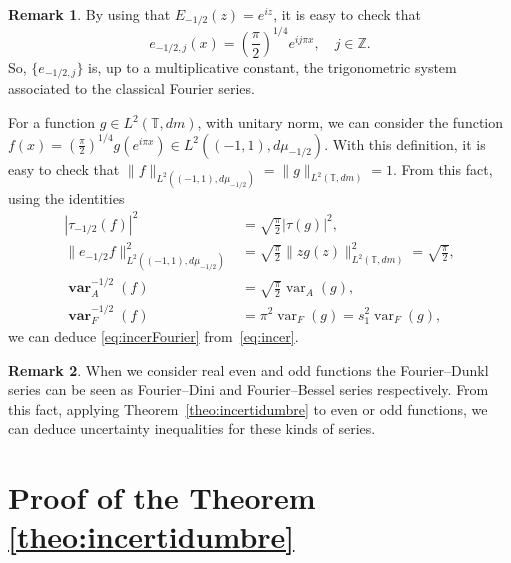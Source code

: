 \documentclass[a4paper]{amsart}
\theoremstyle{plain}
\theoremstyle{definition}
\newtheorem{Rem}{Remark}
\newcommand{\varneg}{\operatorname{\mathbf{var}}}
\newcommand{\var}{\operatorname{var}}
\begin{document}
\begin{Rem}
By using that $E_{-1/2}(z)=e^{iz}$, it is easy to check that
\[
e_{-1/2,j}(x)=\left(\frac{\pi}{2}\right)^{1/4} e^{ij\pi x}, \quad j\in \mathbb{Z}.
\]
So, $\{e_{-1/2,j}\}$ is, up to a multiplicative constant, the trigonometric system associated to the classical Fourier series.

For a function $g\in L^2(\mathbb{T},dm)$, with unitary norm, we can consider the function $f(x) =\left(\frac{\pi}2\right)^{1/4}g(e^{i\pi x})\in L^2((-1,1),d\mu_{-1/2})$. With this definition, it is easy to check that $\|f\|_{L^2((-1,1),d\mu_{-1/2})}=\|g\|_{L^2(\mathbb{T},dm)}=1$.  From this fact, using the identities
\begin{align*}
|\tau_{-1/2}(f)|^2&=\sqrt{\frac{\pi}{2}}|\tau(g)|^2, \\ 
\|e_{-1/2}f\|_{L^2((-1,1),d\mu_{-1/2})}^2
&=\sqrt{\frac{\pi}{2}}\|zg(z)\|^2_{L^2(\mathbb{T},dm)} = \sqrt{\frac{\pi}{2}},\\
\varneg_A^{-1/2}(f) &= \sqrt{\frac{\pi}{2}}\var_A(g), \\ 
\varneg_{F}^{-1/2}(f) &= \pi^2\var_F(g)=s_1^{2}\var_F(g),
\end{align*}
we can deduce \eqref{eq:incerFourier} from~\eqref{eq:incer}.
\end{Rem}


\begin{Rem}
When we consider real even and odd functions the Fourier--Dunkl series can be seen as Fourier--Dini and Fourier--Bessel series respectively. From this fact, applying Theorem~\ref{theo:incertidumbre} to even or odd functions, we can deduce uncertainty inequalities for these kinds of series.
\end{Rem}

\section{Proof of the Theorem \ref{theo:incertidumbre}}
\end{document}
